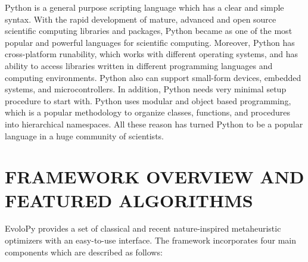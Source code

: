 \documentclass[a4paper,twoside]{article}
\begin{document}
Python is a general purpose scripting language which has a clear and simple syntax. With the rapid development of mature, advanced  and open source scientific computing libraries and packages, Python became as one of the most popular and powerful languages for scientific computing.
Moreover, Python has cross-platform runability, which works with different operating systems, and has ability to access libraries written in different programming languages and computing environments. Python also can support small-form devices, embedded systems, and microcontrollers. In addition, Python needs very minimal setup procedure to start with. Python uses modular and object based programming, which is a popular methodology to organize classes, functions, and procedures into hierarchical namespaces. All these reason has turned Python to be a popular language in a huge community of scientists. 

\section{\uppercase{Framework Overview and Featured algorithms}}

EvoloPy provides a set of classical and recent nature-inspired metaheuristic optimizers with an easy-to-use interface. The framework incorporates four main components which are described as follows: 
\end{document}
